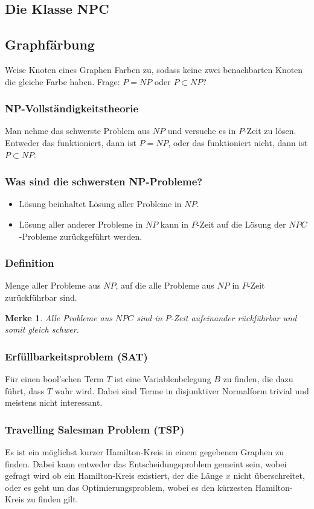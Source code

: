 \documentclass{article}
\begin{document}
\subsection{Die Klasse NPC}
\subsection{Graphf\"arbung}
Weise Knoten eines Graphen Farben zu, sodass keine zwei benachbarten Knoten die gleiche Farbe haben.
Frage: $P = NP$ oder $P \subset NP$?
\subsubsection{NP-Vollständigkeitstheorie}
Man nehme das schwerste Problem aus $NP$ und versuche es in $P$-Zeit zu lösen.\\
Entweder das funktioniert, dann ist $P = NP$, oder das funktioniert nicht, dann ist $P \subset NP$.
\subsubsection{Was sind die schwersten NP-Probleme?}
\begin{itemize}
    \item Lösung beinhaltet Lösung aller Probleme in $NP$.
    \item Lösung aller anderer Probleme in $NP$ kann in $P$-Zeit auf die Lösung der $NPC$-Probleme zurückgeführt werden.
\end{itemize}
\subsubsection{Definition}
Menge aller Probleme aus $NP$, auf die alle Probleme aus $NP$ in $P$-Zeit zurückführbar sind.
\begin{framed}
    \newtheorem*{allenpc}{Merke}
    \begin{allenpc}
        Alle Probleme aus $NPC$ sind in $P$-Zeit aufeinander rückführbar und somit gleich schwer. 
    \end{allenpc}
\end{framed}
\subsubsection{Erfüllbarkeitsproblem (SAT)}
Für einen bool'schen Term $T$ ist eine Variablenbelegung $B$ zu finden, die dazu führt, dass $T$ wahr wird. Dabei sind Terme in disjunktiver Normalform trivial und meistens nicht interessant.

\subsubsection{Travelling Salesman Problem (TSP)}
Es ist ein möglichst kurzer Hamilton-Kreis in einem gegebenen Graphen zu finden. Dabei kann entweder das Entscheidungsproblem gemeint sein, wobei gefragt wird ob ein Hamilton-Kreis existiert, der die Länge $x$ nicht überschreitet, oder es geht um das Optimierungsproblem, wobei es den kürzesten Hamilton-Kreis zu finden gilt.
\end{document}
